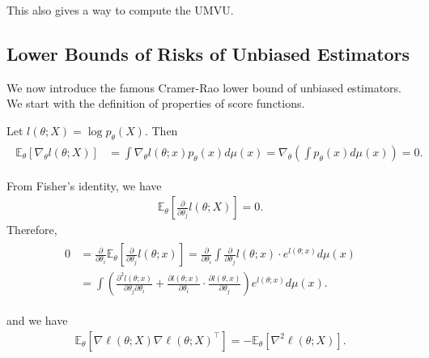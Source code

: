 \begin{remark}
    This also gives a way to compute the UMVU.
\end{remark}

\subsection{Lower Bounds of Risks of Unbiased Estimators}

We now introduce the famous Cramer-Rao lower bound of unbiased estimators. We start with the definition of properties of score functions.

\begin{lem}
    Let $l(\theta;X) =  \log p_\theta(X)$. Then
\begin{align*}
\begin{aligned}
\mathbb{E}_\theta\left[\nabla_\theta l(\theta ; X)\right] & =\int\nabla_\theta l(\theta ; x)p_\theta(x) d \mu(x)=\nabla_\theta\left(\int p_\theta(x) d \mu(x)\right)=0 .
\end{aligned}
\end{align*}
\end{lem}

\begin{lem}
    From Fisher's identity, we have
\begin{align*}
\mathbb{E}_\theta\left[\frac{\partial}{\partial \theta_j} l(\theta ; X)\right]=0 .
\end{align*}
Therefore,
\begin{align*}
\begin{aligned}
0 & =\frac{\partial}{\partial \theta_i} \mathbb{E}_\theta\left[\frac{\partial}{\partial \theta_j} l(\theta ; x)\right] =\frac{\partial}{\partial \theta_i} \int \frac{\partial}{\partial \theta_j} l(\theta ; x) \cdot e^{l(\theta ; x)} d \mu(x)  \\
& =\int\left(\frac{\partial^2 l(\theta ; x)}{\partial \theta_j \partial \theta_i}+\frac{\partial l(\theta ; x)}{\partial \theta_i} \cdot \frac{\partial l(\theta, x)}{\partial \theta_j}\right) e^{l(\theta ; x)} d \mu(x).
\end{aligned}
\end{align*}

and we have
\begin{align*}
\mathbb{E}_\theta\left[\nabla \ell(\theta ; X) \nabla \ell(\theta ; X)^{\top}\right]=-\mathbb{E}_\theta\left[\nabla^2 \ell(\theta ; X)\right] .
\end{align*}

\end{lem}

